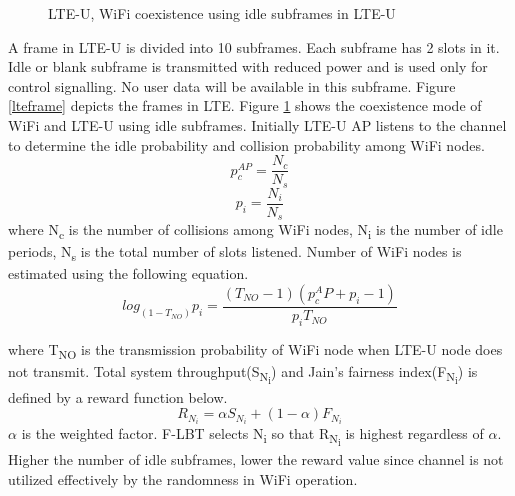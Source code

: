 \documentclass[a4paper]{article}
\begin{document}
\begin{figure}
\caption{{LTE-U}, {WiFi} coexistence using idle subframes in {LTE-U}}
\label{lteWiFicoex}
\end{figure}
A frame in {LTE-U} is divided into 10 subframes. Each subframe has 2 slots in it. Idle or blank subframe is transmitted with reduced power and is used only for control signalling. No user data will be available in this subframe. Figure \ref{lteframe} depicts the frames in LTE.
Figure \ref{lteWiFicoex} shows the coexistence mode of {WiFi} and {LTE-U} using idle subframes.
Initially {LTE-U} AP listens to the channel to determine the idle probability and collision probability among {WiFi} nodes.
\begin{equation}
					p_c^{AP} = \frac{N_c}{N_s}
\end{equation}
\begin{equation}
					p_i = \frac{N_i}{N_s}
\end{equation}
where N\textsubscript{c} is the number of collisions among {WiFi} nodes, N\textsubscript{i} is the number of idle periods, N\textsubscript{s} is the total number of slots listened. Number of {WiFi} nodes is estimated using the following equation. 
\begin{equation}				
					log_{(1-T_{NO})}p_i = \frac{(T_{NO} -1)(p_c^AP + p_i -1)}{p_iT_{NO}}
\end{equation}

where T\textsubscript{NO} is the transmission probability of {WiFi} node when {LTE-U} node does not transmit. Total system throughput(S\textsubscript{N\textsubscript{i}}) and Jain's fairness index(F\textsubscript{N\textsubscript{i}}) is defined by a reward function below. 
\begin{equation}
					R_{N_i} = \alpha S_{N_i} + (1 - \alpha)F_{N_i}
\end{equation}
$\alpha$ is the weighted factor.
F-LBT selects N\textsubscript{i} so that R\textsubscript{N\textsubscript{i}} is highest regardless of $\alpha$. Higher the number of idle subframes, lower the reward value since channel is not utilized effectively by the randomness in {WiFi} operation.
\end{document}
